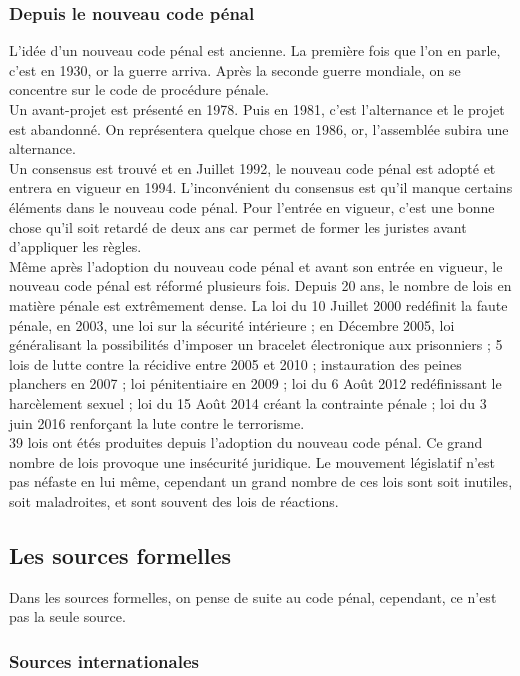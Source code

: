 \documentclass[10pt, a4paper, openany]{book}
\begin{document}
\subsubsection{Depuis le nouveau code pénal}

L'idée d'un nouveau code pénal est ancienne. La première fois que l'on en parle, c'est en 1930, or la guerre arriva. Après la seconde guerre mondiale, on se concentre sur le code de procédure pénale. \\ 
Un avant-projet est présenté en 1978. Puis en 1981, c'est l'alternance et le projet est abandonné. On représentera quelque chose en 1986, or, l'assemblée subira une alternance. \\
Un consensus est trouvé et en Juillet 1992, le nouveau code pénal est adopté et entrera en vigueur en 1994. L'inconvénient du consensus est qu'il manque certains éléments dans le nouveau code pénal. Pour l'entrée en vigueur, c'est une bonne chose qu'il soit retardé de deux ans car permet de former les juristes avant d'appliquer les règles. \\
Même après l'adoption du nouveau code pénal et avant son entrée en vigueur, le nouveau code pénal est réformé plusieurs fois. Depuis 20 ans, le nombre de lois en matière pénale est extrêmement dense. La loi du 10 Juillet 2000 redéfinit la faute pénale, en 2003, une loi sur la sécurité intérieure ; en Décembre 2005, loi généralisant la possibilités d'imposer un bracelet électronique aux prisonniers ; 5 lois de lutte contre la récidive entre 2005 et 2010 ; instauration des peines planchers en 2007 ; loi pénitentiaire en 2009 ; loi du 6 Août 2012 redéfinissant le harcèlement sexuel ; loi du 15 Août 2014 créant la contrainte pénale ; loi du 3 juin 2016 renforçant la lute contre le terrorisme. \\
39 lois ont étés produites depuis l'adoption du nouveau code pénal. Ce grand nombre de lois provoque une insécurité juridique. Le mouvement législatif n'est pas néfaste en lui même, cependant un grand nombre de ces lois sont soit inutiles, soit maladroites, et sont souvent des lois de réactions. 

\subsection{Les sources formelles}

Dans les sources formelles, on pense de suite au code pénal, cependant, ce n'est pas la seule source. 

\subsubsection{Sources internationales}
\end{document}
